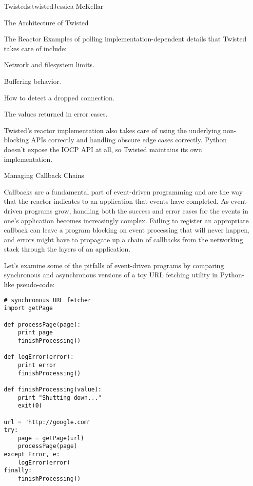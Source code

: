 \begin{aosachapter}{Twisted}{s:twisted}{Jessica McKellar}
\begin{aosasect1}{The Architecture of Twisted}
\begin{aosasect2}{The Reactor}
Examples of polling implementation-dependent details that Twisted takes care
of include:

\begin{aosaitemize}

\item Network and filesystem limits.

\item Buffering behavior.

\item How to detect a dropped connection.

\item The values returned in error cases.

\end{aosaitemize}

Twisted's reactor implementation also takes care of using the underlying
non-blocking APIs correctly and handling obscure edge cases correctly. Python
doesn't expose the IOCP API at all, so Twisted maintains its own
implementation.

\end{aosasect2}

\begin{aosasect2}{Managing Callback Chains}

Callbacks are a fundamental part of event-driven programming and are the way
that the reactor indicates to an application that events have completed. As
event-driven programs grow, handling both the success and error cases for the
events in one's application becomes increasingly complex. Failing to register an
appropriate callback can leave a program blocking on event processing that will
never happen, and errors might have to propagate up a chain of callbacks from
the networking stack through the layers of an application.

Let's examine some of the pitfalls of event-driven programs by comparing
synchronous and asynchronous versions of a toy URL fetching utility in
Python-like pseudo-code:

\begin{verbatim}
# synchronous URL fetcher
import getPage

def processPage(page):
    print page
    finishProcessing()

def logError(error):
    print error
    finishProcessing()

def finishProcessing(value):
    print "Shutting down..."
    exit(0)

url = "http://google.com"
try:
    page = getPage(url)
    processPage(page)
except Error, e:
    logError(error)
finally:
    finishProcessing()



\end{verbatim}
\end{aosasect2}
\end{aosasect1}
\end{aosachapter}
